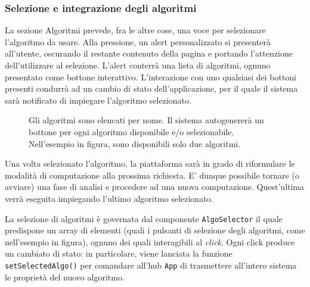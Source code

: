 \subsubsection{Selezione e integrazione degli algoritmi}

La sezione Algoritmi prevede, fra le altre cose, una voce per selezionare l'algoritmo da usare. Alla pressione, un alert personalizzato si presenterà all'utente, oscurando il restante contenuto della pagina e portando l'attenzione dell'utilizzare al selezione. L'alert conterrà una lista di algoritmi, ognuno presentato come bottone interattivo. L'interazione con uno qualsiasi dei bottoni presenti condurrà ad un cambio di stato dell'applicazione, per il quale il sistema sarà notificato di impiegare l'algoritmo selezionato.

\begin{figure}[ht!]
    \centering
    \caption{Gli algoritmi sono elencati per nome. Il sistema autogenererà un bottone per ogni algoritmo disponibile e/o selezionabile. Nell'esempio in figura, sono disponibili solo due algoritmi.}
    \label{fig:esempio}
\end{figure}

Una volta selezionato l'algoritmo, la piattaforma sarà in grado di riformulare le modalità di computazione alla prossima richiesta. E' dunque possibile tornare (o avviare) una fase di analisi e procedere ad una nuova computazione. Quest'ultima verrà eseguita impiegando l'ultimo algoritmo selezionato.

\vspace{3mm}

La selezione di algoritmi è governata dal componente \verb|AlgoSelector| il quale predispone un array di elementi (quali i pulsanti di selezione degli algoritmi, come nell'esempio in figura), ognuno dei quali interagibili al \textit{click}. Ogni click produce un cambiato di stato: in particolare, viene lanciata la funzione \verb|setSelectedAlgo()| per comandare all'hub \verb|App| di trasmettere all'intero sistema le proprietà del nuovo algoritmo.

